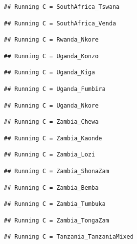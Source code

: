 \documentclass[
]{article}
\begin{document}
\begin{verbatim}
## Running C = SouthAfrica_Tswana
\end{verbatim}

\begin{verbatim}
## Running C = SouthAfrica_Venda
\end{verbatim}

\begin{verbatim}
## Running C = Rwanda_Nkore
\end{verbatim}

\begin{verbatim}
## Running C = Uganda_Konzo
\end{verbatim}

\begin{verbatim}
## Running C = Uganda_Kiga
\end{verbatim}

\begin{verbatim}
## Running C = Uganda_Fumbira
\end{verbatim}

\begin{verbatim}
## Running C = Uganda_Nkore
\end{verbatim}

\begin{verbatim}
## Running C = Zambia_Chewa
\end{verbatim}

\begin{verbatim}
## Running C = Zambia_Kaonde
\end{verbatim}

\begin{verbatim}
## Running C = Zambia_Lozi
\end{verbatim}

\begin{verbatim}
## Running C = Zambia_ShonaZam
\end{verbatim}

\begin{verbatim}
## Running C = Zambia_Bemba
\end{verbatim}

\begin{verbatim}
## Running C = Zambia_Tumbuka
\end{verbatim}

\begin{verbatim}
## Running C = Zambia_TongaZam
\end{verbatim}

\begin{verbatim}
## Running C = Tanzania_TanzaniaMixed
\end{verbatim}
\end{document}
